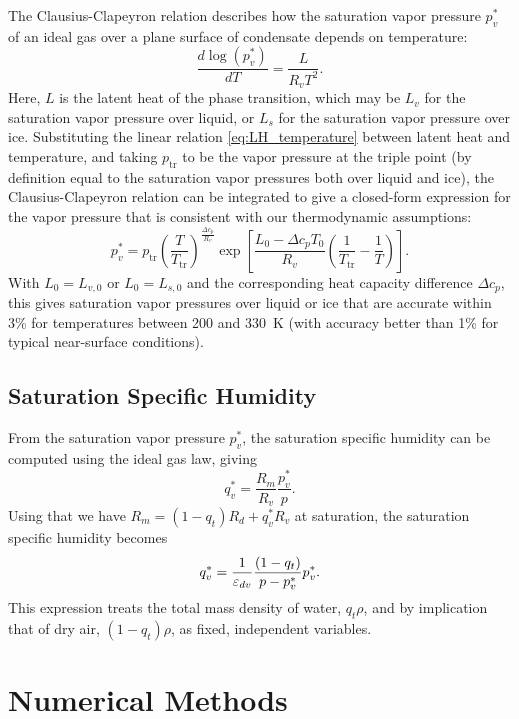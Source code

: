 \documentclass{article}
\begin{document}
The Clausius-Clapeyron relation describes how the saturation vapor pressure $p_v^*$ of an ideal gas over a plane surface of condensate depends on temperature:
\begin{equation}
    \frac{d \log(p_v^*)}{dT} = \frac{L}{R_v T^2}.
\end{equation}
Here, $L$ is the latent heat of the phase transition, which may be $L_v$ for the saturation vapor pressure over liquid, or $L_s$ for the saturation vapor pressure over ice. Substituting the linear relation \eqref{eq:LH_temperature} between latent heat and temperature, and taking $p_\mathrm{tr}$ to be the vapor pressure at the triple point (by definition equal to the saturation vapor pressures both over liquid and ice), the Clausius-Clapeyron relation can be integrated to give a closed-form expression for the vapor pressure that is consistent with our thermodynamic assumptions:
\begin{equation}
    p_v^* = p_{\mathrm{tr}} \left( \frac{T}{T_{\mathrm{tr}}} \right)^{\frac{\Delta c_p}{R_v}}
        \exp \left[ \frac{L_0 - \Delta c_p T_0}{R_v} 
        \left( \frac{1}{T_{\mathrm{tr}}} - \frac{1}{T} \right) \right].
\end{equation}
With $L_0 = L_{v,0}$ or $L_0 = L_{s,0}$ and the corresponding heat capacity difference $\Delta c_p$, this gives saturation vapor pressures over liquid or ice that are accurate within 3\% for temperatures between 200 and 330~K (with accuracy better than 1\% for typical near-surface conditions).

\subsection{Saturation Specific Humidity}

From the saturation vapor pressure $p_v^*$, the saturation specific humidity can be computed using the ideal gas law, giving
\begin{equation}
     q_v^* = \frac{R_m}{R_v} \frac{p_v^*}{p}.
\end{equation}
Using that we have $R_m = (1-q_t) R_d + q_v^* R_v$ at saturation, the saturation specific humidity becomes 
\begin{equation}
    q_v^* = \frac{1}{\varepsilon_{dv}} \frac{(1 - q_t)}{p - p_v^*} p_v^*.
\end{equation}
This expression treats the total mass density of water, $q_t \rho$, and by implication that of dry air, $(1-q_t)\rho$, as fixed, independent variables.

\section{Numerical Methods}
\label{sec:numerical_methods}
\end{document}
